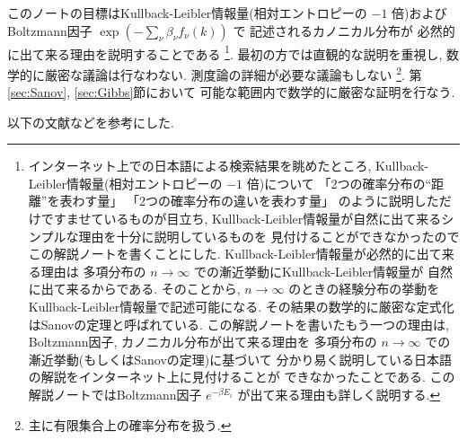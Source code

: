 \documentclass[12pt,twoside]{jarticle}
\theoremstyle{jplain}
\theoremstyle{jplain}
\theoremstyle{jplain}
\numberwithin{theorem}{section}
\numberwithin{equation}{section}
\numberwithin{figure}{section}
\numberwithin{table}{section}
\begin{document}
このノートの目標はKullback-Leibler情報量(相対エントロピーの $-1$ 倍)および
Boltzmann因子 $\exp(-\sum_\nu \beta_\nu f_{\nu}(k))$ で
記述されるカノニカル分布が
必然的に出て来る理由を説明することである%
\footnote{インターネット上での日本語による検索結果を眺めたところ, 
Kullback-Leibler情報量(相対エントロピーの $-1$ 倍)について
「2つの確率分布の``距離''を表わす量」
「2つの確率分布の違いを表わす量」
のように説明しただけですませているものが目立ち, 
Kullback-Leibler情報量が自然に出て来るシンプルな理由を十分に説明しているものを
見付けることができなかったのでこの解説ノートを書くことにした.
Kullback-Leibler情報量が必然的に出て来る理由は
多項分布の $n\to\infty$ での漸近挙動にKullback-Leibler情報量が
自然に出て来るからである.
そのことから, $n\to\infty$ のときの経験分布の挙動を
Kullback-Leibler情報量で記述可能になる.
その結果の数学的に厳密な定式化はSanovの定理と呼ばれている.
この解説ノートを書いたもう一つの理由は, 
Boltzmann因子, カノニカル分布が出て来る理由を
多項分布の $n\to\infty$ での漸近挙動(もしくはSanovの定理)に基づいて
分かり易く説明している日本語の解説をインターネット上に見付けることが
できなかったことである. 
この解説ノートではBoltzmann因子 $e^{-\beta E_i}$ が出て来る理由も詳しく説明する.}.
最初の方では直観的な説明を重視し, 数学的に厳密な議論は行なわない.
測度論の詳細が必要な議論もしない%
\footnote{主に有限集合上の確率分布を扱う.}.
第\ref{sec:Sanov}, \ref{sec:Gibbs}節において
可能な範囲内で数学的に厳密な証明を行なう.

\bigskip

以下の文献などを参考にした.
\end{document}
